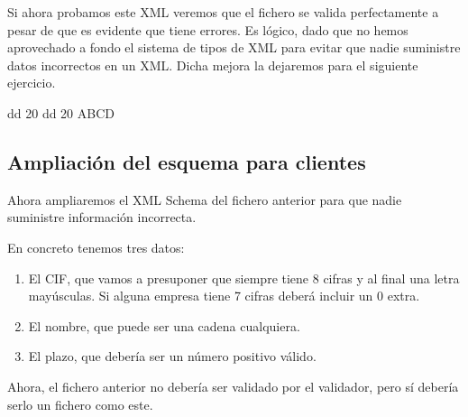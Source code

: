 \documentclass[letterpaper,10pt,spanish]{sphinxmanual}
\begin{document}
Si ahora probamos este XML veremos que el fichero se valida perfectamente a pesar de que es evidente que tiene errores. Es lógico, dado que no hemos aprovechado a fondo el sistema de tipos de XML para evitar que nadie suministre datos incorrectos en un XML. Dicha mejora la dejaremos para el siguiente ejercicio.

\begin{sphinxVerbatim}[commandchars=\\\{\}]
        dd
        20
        dd
        20
        ABCD
\end{sphinxVerbatim}


\subsection{Ampliación del esquema para clientes}
\label{\detokenize{tema5:ampliacion-del-esquema-para-clientes}}
Ahora ampliaremos el XML Schema del fichero anterior para que nadie suministre información incorrecta.

En concreto tenemos tres datos:
\begin{enumerate}
\item {} 
El CIF, que vamos a presuponer que siempre tiene 8 cifras y al final una letra mayúsculas. Si alguna empresa tiene 7 cifras deberá incluir un 0 extra.

\item {} 
El nombre, que puede ser una cadena cualquiera.

\item {} 
El plazo, que debería ser un número positivo válido.

\end{enumerate}

Ahora, el fichero anterior no debería ser validado por el validador, pero sí debería serlo un fichero como este.
\end{document}
